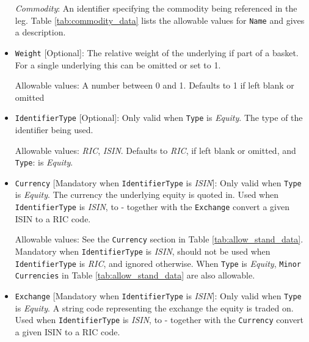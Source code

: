 \begin{itemize}
 \emph{Commodity}: An identifier specifying the commodity being referenced in the leg.
Table \ref{tab:commodity_data} lists the allowable values for \lstinline!Name! and gives a description. \\

\item \lstinline!Weight! [Optional]:
The relative weight of the underlying if part of a basket. For a single underlying this can be omitted or set to 1. 

Allowable values: A number between 0 and 1. Defaults to 1 if left blank or omitted

\item \lstinline!IdentifierType! [Optional]:
Only valid when \lstinline!Type! is  \emph{Equity}. The type of the identifier being used.  

Allowable values:  \emph{RIC}, \emph{ISIN}. Defaults to \emph{RIC}, if left blank or omitted, and \lstinline!Type!: is  \emph{Equity}.

\item \lstinline!Currency! [Mandatory when \lstinline!IdentifierType! is  \emph{ISIN}]: Only valid when \lstinline!Type! is  \emph{Equity}. The currency the underlying equity is quoted in. Used when \lstinline!IdentifierType! is  \emph{ISIN}, to - together with the \lstinline!Exchange!  convert a given ISIN to a RIC code.  

Allowable values: See the \lstinline!Currency! section in Table \ref{tab:allow_stand_data}. Mandatory when \lstinline!IdentifierType! is  \emph{ISIN}, should not be used when  \lstinline!IdentifierType! is  \emph{RIC}, and ignored otherwise. When \lstinline!Type! is \emph{Equity}, \lstinline!Minor Currencies! in Table \ref{tab:allow_stand_data} are also allowable.

\item \lstinline!Exchange! [Mandatory when \lstinline!IdentifierType! is  \emph{ISIN}]:
Only valid when \lstinline!Type! is  \emph{Equity}. A string code representing the exchange the equity is traded on. Used when \lstinline!IdentifierType! is  \emph{ISIN}, to - together with the \lstinline!Currency!  convert a given ISIN to a RIC code.  


\end{itemize}
